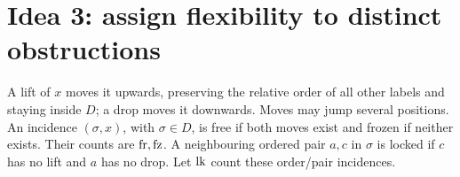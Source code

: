 \section{Idea 3: assign flexibility to distinct obstructions}\label{sec:gap}

\begin{definition}\label{def:moves}
A lift of \(x\) moves it upwards, preserving the relative order of all
other labels and staying inside \(D\); a drop moves it downwards.
Moves may jump several positions. An incidence \((\sigma,x)\), with
\(\sigma\in D\), is free if both moves exist and frozen if neither
exists. Their counts are \(\operatorname{fr},\operatorname{fz}\). A neighbouring ordered pair
\(a,c\) in \(\sigma\) is locked if \(c\) has no lift and \(a\)
has no drop. Let \(\operatorname{lk}\) count these order/pair incidences.
\end{definition}

